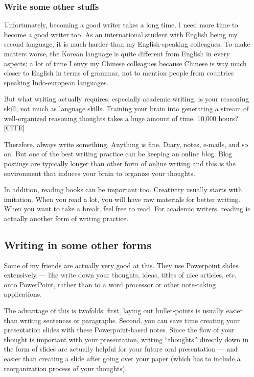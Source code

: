 \documentclass[11pt]{article}
\begin{document}

\subsubsection{Write some other stuffs}
Unfortunately, becoming a good writer takes a long time. I need
more time to become a good writer too. As an international student
with English being my second language, it is much harder than my
English-speaking colleagues. To make matters worse, the Korean
language is quite different from English in every aspects; a lot
of time I envy my Chinese colleagues because Chinese is way much
closer to English in terms of grammar, not to mention people from
countries speaking Indo-european languages.

But what writing actually requires, especially academic writing,
is your reasoning skill, not much as language skills. Training
your brain into generating a stream of well-organized reasoning
thoughts takes a huge amount of time. 10,000 hours? [CITE]

Therefore, always write something. Anything is fine. Diary, notes,
e-mails, and so on. But one of the best writing practice can be
keeping an online blog.  Blog postings are typically longer than
other form of online writing and this is the environment that
induces your brain to organize your thoughts. 

In addition, reading books can be important too. Creativity
usually starts with imitation. When you read a lot, you will have
raw materials for better writing.  When you want to take a break,
feel free to read. For academic writers, reading is actually
another form of writing practice.

\subsection{Writing in some other forms}
Some of my friends are actually very good at this. They use Powerpoint slides
extensively --- like write down your thoughts, ideas, titles of nice articles,
etc. onto PowerPoint, rather than to a word processor or other note-taking
applications.

The advantage of this is twofolds: first, laying out bullet-points is usually
easier than writing sentences or paragraphs. Second, you can save time
creating your presentation slides with these Powerpoint-based notes. Since
the flow of your thought is important with your presentation, writing
``thoughts'' directly down in the form of slides are actually helpful for your
future oral presentation --- and easier than creating a slide after going
over your paper (which has to include a reorganization process of your
thoughts).
\end{document}
